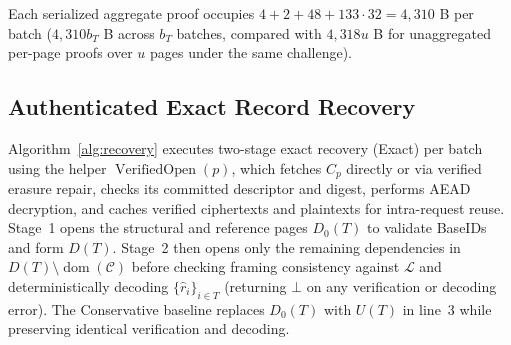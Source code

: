 \documentclass[10pt,journal]{IEEEtran}
\begin{document}
Each serialized aggregate proof occupies $4+2+48+133\cdot32=4{,}310$ B per batch ($4{,}310b_T$ B across $b_T$ batches, compared with $4{,}318u$ B for unaggregated per-page proofs over $u$ pages under the same challenge).

\subsection{Authenticated Exact Record Recovery}\label{sec:c3}
Algorithm~\ref{alg:recovery} executes two-stage exact recovery (Exact) per batch using the helper $\operatorname{VerifiedOpen}(p)$, which fetches $C_p$ directly or via verified erasure repair, checks its committed descriptor and digest, performs AEAD decryption, and caches verified ciphertexts and plaintexts for intra-request reuse. Stage~1 opens the structural and reference pages $D_0(T)$ to validate BaseIDs and form $D(T)$. Stage~2 then opens only the remaining dependencies in $D(T)\setminus\operatorname{dom}(\mathcal C)$ before checking framing consistency against $\mathcal L$ and deterministically decoding $\{\widehat r_i\}_{i\in T}$ (returning $\bot$ on any verification or decoding error). The Conservative baseline replaces $D_0(T)$ with $U(T)$ in line~3 while preserving identical verification and decoding.
\end{document}
